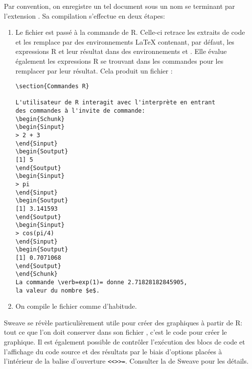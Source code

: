 Par convention, on enregistre un tel document sous un nom se terminant
par l'extension . Sa compilation s'effectue
en deux étapes:
\begin{enumerate}
\item Le fichier  est passé à la commande 
  de R. Celle-ci retrace les extraits de code et les remplace par des
  environnements {\LaTeX} contenant, par défaut, les expressions R et
  leur résultat dans des environnements  et .
  Elle évalue également les expressions R se trouvant dans les
  commandes \cmd{\Sexpr} pour les remplacer par leur résultat. Cela
  produit un fichier :
\begin{lstlisting}
\section{Commandes R}

L'utilisateur de R interagit avec l'interprète en entrant
des commandes à l'invite de commande:
\begin{Schunk}
\begin{Sinput}
> 2 + 3
\end{Sinput}
\begin{Soutput}
[1] 5
\end{Soutput}
\begin{Sinput}
> pi
\end{Sinput}
\begin{Soutput}
[1] 3.141593
\end{Soutput}
\begin{Sinput}
> cos(pi/4)
\end{Sinput}
\begin{Soutput}
[1] 0.7071068
\end{Soutput}
\end{Schunk}
La commande \verb=exp(1)= donne 2.71828182845905,
la valeur du nombre $e$.
\end{lstlisting}
\item On compile le fichier  comme d'habitude.
\end{enumerate}

Sweave se révèle particulièrement utile pour créer des graphiques à
partir de R: tout ce que l'on doit conserver dans son fichier
, c'est le code pour créer le graphique. Il est également
possible de contrôler l'exécution des blocs de code et l'affichage du
code source et des résultats par le biais d'options placées à
l'intérieur de la balise d'ouverture \verb|<<>>=|. Consulter la %
de Sweave pour les détails.

